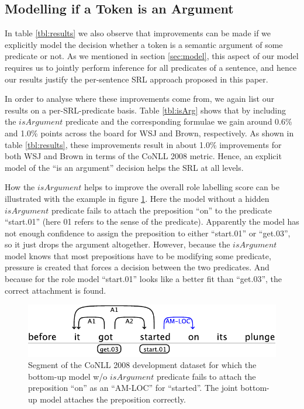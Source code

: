 
\subsection{Modelling if a Token is an Argument}
In table \ref{tbl:results} we also observe that improvements can be made if we explicitly model the decision whether a token is a semantic argument of some predicate or not. As we mentioned in section \ref{sec:model}, this aspect of our model requires us to jointly perform inference for all predicates of a sentence, and hence our results justify the per-sentence SRL approach proposed in this paper.

In order to analyse where these improvements come from, we again list our results on a per-SRL-predicate basis. Table \ref{tbl:isArg} shows that by including the $isArgument$ predicate and the corresponding formulae we gain around 0.6\% and 1.0\% points across the board for WSJ and Brown, respectively. As shown in table \ref{tbl:results}, these improvements result in about 1.0\% improvements for both WSJ and Brown in terms of the CoNLL 2008 metric. Hence, an explicit model of the ``is an argument'' decision helps the SRL at all levels. 

How the $isArgument$ helps to improve the overall role labelling score can be illustrated with the example in figure \ref{fig:isArg}. Here the model without a hidden $isArgument$ predicate fails to attach the preposition ``on'' to the predicate ``start.01'' (here 01 refers to the sense of the predicate). Apparently the model has not enough confidence to assign the preposition to either ``start.01'' or ``get.03'', so it just drops the argument altogether. However, because the $isArgument$ model knows that most prepositions have to be modifying some predicate, pressure is created that forces a decision between the two predicates. And because for the role model ``start.01'' looks like a better fit than ``get.03'', the correct attachment is found.

\begin{figure}
\begin{center}
    \includegraphics[scale=.62]{is-arg-example}
\end{center}
\caption{Segment of the CoNLL 2008 development dataset for which the bottom-up model w/o $isArgument$ predicate fails to attach the preposition ``on'' as an ``AM-LOC'' for ``started''. The joint bottom-up model attaches the preposition correctly.}
\label{fig:isArg}
\end{figure}


